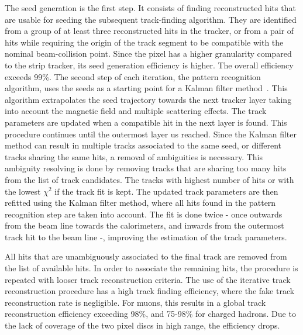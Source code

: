 {The seed generation is the first step. It consists of finding reconstructed hits that are usable for seeding the subsequent track-finding algorithm. They are identified from a group of at least three reconstructed hits in the tracker, or from a pair of hits while requiring the origin of the track segment to be compatible with the nominal beam-collision point. Since the pixel has a higher granularity compared to the strip tracker, its seed generation efficiency is higher. The overall efficiency exceeds 99\%.
The second step of each iteration, the pattern recognition algorithm, uses the seeds as a starting point for a Kalman filter method~\cite{FRUHWIRTH1987444,Billoir:1989mh}. This algorithm extrapolates the seed trajectory towards the next tracker layer taking into account the magnetic field and multiple scattering effects. The track parameters are updated when a compatible hit in the next layer is found. This procedure continues until the outermost layer us reached.
Since the Kalman filter method can result in multiple tracks associated to the same seed, or different tracks sharing the same hits, a removal of ambiguities is necessary. This ambiguity resolving is done by removing tracks that are sharing too many hits from the list of track candidates. The tracks with highest number of hits or with the lowest $\chi^2$ if the track fit is kept. 
The updated track parameters are then refitted using the Kalman filter method, where all hits found in the pattern recognition step are taken into account. The fit is done twice - once outwards from the beam line towards the calorimeters, and inwards from the outermost track hit to the beam line -, improving the estimation of the track parameters. 

All hits that are unambiguously associated to the final track are removed from the list of available hits. In order to associate the remaining hits, the procedure is repeated with looser track reconstruction criteria. The use of the iterative track reconstruction procedure has a high track finding efficiency, where the fake track reconstruction rate is negligible. 
For muons, this results in a global track reconstruction efficiency exceeding 98\%, and 75-98\% for charged hadrons. Due to the lack of coverage of the two pixel discs in high \abspsrap range, the efficiency drops. 
}
